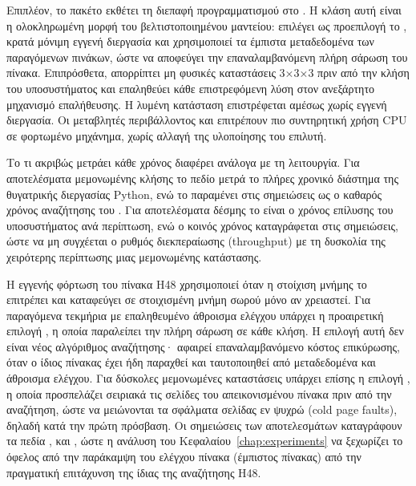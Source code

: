 Επιπλέον, το πακέτο εκθέτει τη διεπαφή προγραμματισμού  στο . Η κλάση αυτή είναι η ολοκληρωμένη μορφή του βελτιστοποιημένου μαντείου: επιλέγει ως προεπιλογή το , κρατά μόνιμη εγγενή διεργασία και χρησιμοποιεί τα έμπιστα μεταδεδομένα των παραγόμενων πινάκων, ώστε να αποφεύγει την επαναλαμβανόμενη πλήρη σάρωση του πίνακα. Επιπρόσθετα, απορρίπτει μη φυσικές καταστάσεις 3×3×3 πριν από την κλήση του υποσυστήματος και επαληθεύει κάθε επιστρεφόμενη λύση στον ανεξάρτητο μηχανισμό επαλήθευσης. Η λυμένη κατάσταση επιστρέφεται αμέσως χωρίς εγγενή διεργασία. Οι μεταβλητές περιβάλλοντος  και  επιτρέπουν πιο συντηρητική χρήση CPU σε φορτωμένο μηχάνημα, χωρίς αλλαγή της υλοποίησης του επιλυτή.

Το τι ακριβώς μετράει κάθε χρόνος διαφέρει ανάλογα με τη λειτουργία. Για αποτελέσματα μεμονωμένης κλήσης το πεδίο  μετρά το πλήρες χρονικό διάστημα της θυγατρικής διεργασίας Python, ενώ το  παραμένει στις σημειώσεις ως ο καθαρός χρόνος αναζήτησης του . Για αποτελέσματα δέσμης το  είναι ο χρόνος επίλυσης του υποσυστήματος ανά περίπτωση, ενώ ο κοινός χρόνος  καταγράφεται στις σημειώσεις, ώστε να μη συγχέεται ο ρυθμός διεκπεραίωσης (throughput) με τη δυσκολία της χειρότερης περίπτωσης μιας μεμονωμένης κατάστασης.

Η εγγενής φόρτωση του πίνακα H48 χρησιμοποιεί  όταν η στοίχιση μνήμης το επιτρέπει και καταφεύγει σε στοιχισμένη μνήμη σωρού μόνο αν χρειαστεί. Για παραγόμενα τεκμήρια με επαληθευμένο άθροισμα ελέγχου υπάρχει η προαιρετική επιλογή , η οποία παραλείπει την πλήρη σάρωση  σε κάθε κλήση. Η επιλογή αυτή δεν είναι νέος αλγόριθμος αναζήτησης· αφαιρεί επαναλαμβανόμενο κόστος επικύρωσης, όταν ο ίδιος πίνακας έχει ήδη παραχθεί και ταυτοποιηθεί από μεταδεδομένα και άθροισμα ελέγχου. Για δύσκολες μεμονωμένες καταστάσεις υπάρχει επίσης η επιλογή , η οποία προσπελάζει σειριακά τις σελίδες του απεικονισμένου πίνακα πριν από την αναζήτηση, ώστε να μειώνονται τα σφάλματα σελίδας εν ψυχρώ (cold page faults), δηλαδή κατά την πρώτη πρόσβαση. Οι σημειώσεις των αποτελεσμάτων καταγράφουν τα πεδία ,  και , ώστε η ανάλυση του Κεφαλαίου~\ref{chap:experiments} να ξεχωρίζει το όφελος από την παράκαμψη του ελέγχου πίνακα (έμπιστος πίνακας) από την πραγματική επιτάχυνση της ίδιας της αναζήτησης H48.


